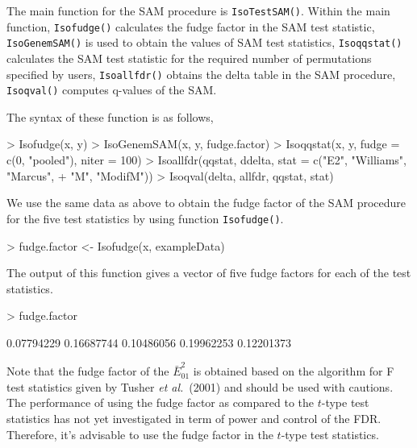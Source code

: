 \documentclass[10pt]{article}
\begin{document}
The main function for the SAM procedure is \texttt{IsoTestSAM()}. Within the main function, \texttt{Isofudge()}
calculates the fudge factor in the SAM test statistic, \texttt{IsoGenemSAM()} is used
to obtain the values of SAM test statistics, \texttt{Isoqqstat()} calculates the SAM test statistic
for the required number of permutations specified by users, \texttt{Isoallfdr()} obtains the delta table in the SAM procedure,
\texttt{Isoqval()} computes q-values of the SAM.  %

The syntax of these function is as follows,

\begin{Schunk}
\begin{Sinput}
> Isofudge(x, y)
> IsoGenemSAM(x, y, fudge.factor)
> Isoqqstat(x, y, fudge = c(0, "pooled"), niter = 100)
> Isoallfdr(qqstat, ddelta, stat = c("E2", "Williams", "Marcus", 
+     "M", "ModifM"))
> Isoqval(delta, allfdr, qqstat, stat)
\end{Sinput}
\end{Schunk}

We use the same data as above to obtain the fudge factor of the SAM procedure for
the five test statistics by using function \texttt{Isofudge()}.

\begin{Schunk}
\begin{Sinput}
> fudge.factor <- Isofudge(x, exampleData)
\end{Sinput}
\end{Schunk}

The output of this function gives a vector of five fudge factors for each of the test statistics.

\begin{Schunk}
\begin{Sinput}
> fudge.factor
\end{Sinput}
\begin{Soutput}
[1] 0.07794229 0.16687744 0.10486056 0.19962253 0.12201373
\end{Soutput}
\end{Schunk}

Note that the fudge factor of the $\bar{E}_{01}^2$ is obtained based on the algorithm for F test
statistics given by Tusher \textit{et al.}\ (2001) and should be used with cautions. The performance of using
the fudge factor as compared to the $t$-type test statistics has not yet investigated in term of
power and control of the FDR. Therefore, it's advisable to use the fudge factor in the $t$-type test statistics.
\end{document}
